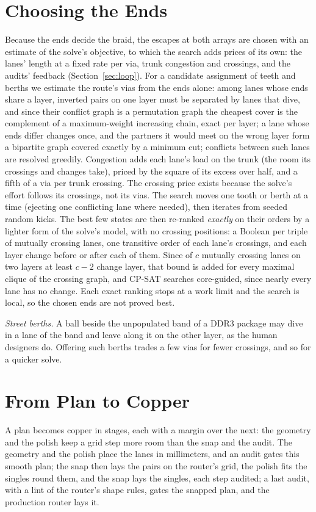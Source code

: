 \documentclass[journal]{IEEEtran}
\begin{document}
\section{Choosing the Ends}
\label{sec:ends}
Because the ends decide the braid, the escapes at both arrays are chosen with an estimate of the solve's objective, to which the search adds prices of its own: the lanes' length at a fixed rate per via, trunk congestion and crossings, and the audits' feedback (Section~\ref{sec:loop}). For a candidate assignment of teeth and berths we estimate the route's vias from the ends alone:
among lanes whose ends share a layer, inverted pairs on one layer must be separated by lanes that dive, and since their conflict graph is a permutation graph the cheapest cover is the complement of a maximum-weight increasing chain, exact per layer; a lane whose ends differ changes once, and the partners it would meet on the wrong layer form a bipartite graph covered exactly by a minimum cut; conflicts between such lanes are resolved greedily. Congestion adds each lane's load on the trunk (the room its crossings and changes take), priced by the square of its excess over half, and a fifth of a via per trunk crossing. The crossing price exists because the solve's effort follows its crossings, not its vias. The search moves one tooth or berth at a time (ejecting one conflicting lane where needed), then iterates from seeded random kicks. The best few states are then re-ranked \emph{exactly} on their orders by a lighter form of the solve's model, with no crossing positions: a Boolean per triple of mutually crossing lanes, one transitive order of each lane's crossings, and each layer change before or after each of them. Since of $c$ mutually crossing lanes on two layers at least $c-2$ change layer, that bound is added for every maximal clique of the crossing graph, and CP-SAT searches core-guided, since nearly every lane has no change. Each exact ranking stops at a work limit and the search is local, so the chosen ends are not proved best.

\emph{Street berths.} A ball beside the unpopulated band of a DDR3 package may dive in a lane of the band and leave along it on the other layer, as the human designers do. Offering such berths trades a few vias for fewer crossings, and so for a quicker solve.

\section{From Plan to Copper}
\label{sec:copper}
A plan becomes copper in stages, each with a margin over the next: the geometry and the polish keep a grid step more room than the snap and the audit. The geometry and the polish place the lanes in millimeters, and an audit gates this smooth plan; the snap then lays the pairs on the router's grid, the polish fits the singles round them, and the snap lays the singles, each step audited; a last audit, with a lint of the router's shape rules, gates the snapped plan, and the production router lays it.
\end{document}
